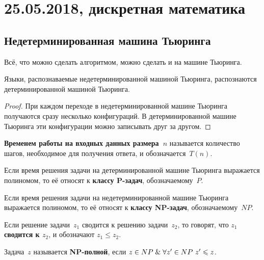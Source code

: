 \chapter{25.05.2018, дискретная математика}
\section{Недетерминированная машина Тьюринга}
\begin{statement}
Всё, что можно сделать алгоритмом, можно сделать и на машине Тьюринга.
\end{statement}

\begin{statement}
Языки, распознаваемые недетерминированной машиной Тьюринга, распознаются детерминированной машиной Тьюринга.
\end{statement}
\begin{proof}
При каждом переходе в недетерминированной машине Тьюринга получаются сразу несколько конфигураций.
В детерминированной машине Тьюринга эти конфигурации можно записывать друг за другом.
\end{proof}

\textbf{Временем работы на входных данных размера~$n$} называется количество шагов, необходимое для получения ответа, и обозначается~$T(n)$.

Если время решения задачи на детерминированной машине Тьюринга выражается полиномом, то её относят к \textbf{классу P-задач}, обозначаемому~$P$.

Если время решения задачи на недетерминированной машине Тьюринга выражается полиномом, то её относят к \textbf{классу NP-задач}, обозначаемому~$NP$.

Если решение задачи~$z_1$ сводится к решению задачи~$z_2$, то говорят, что \textbf{$z_1$ сводится к $z_2$}, и обозначают $z_1 \leqslant z_2$.

Задача~$z$ называется \textbf{NP-полной}, если $z \in NP \mathrel{\&} \forall z' \in NP \ z' \leqslant z$.